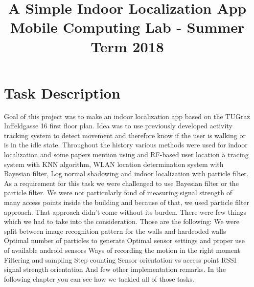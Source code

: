 \documentclass[conference]{IEEEtran}
\begin{document}
\title{A Simple Indoor Localization App\\
{\large Mobile Computing Lab - Summer Term 2018}
}

\author{
\and
{}
}

\maketitle


\section{Task Description}
Goal of this project was to make an indoor localization app based on the TUGraz Inffeldgasse 16 first floor plan. Idea was to use previously developed activity tracking system to detect movement and therefore know if the user is walking or is in the idle state. Throughout the history various methods were used for indoor localization and some papers mention using and RF-based user location a tracing system with KNN algorithm, WLAN location determination system with Bayesian filter, Log normal shadowing and indoor localization with particle filter. As a requirement for this task we were challenged to use Bayesian filter or the particle filter. We were not particularly fond of measuring signal strength of many access points inside the building and because of that, we used particle filter approach. That approach didn’t come without its burden. There were few things which we had to take into the consideration. Those are the following:
We were split between image recognition pattern for the walls and hardcoded walls
Optimal number of particles to generate
Optimal sensor settings and proper use of available android sensors
Ways of recording the motion in the right moment 
Filtering and sampling
Step counting
Sensor orientation vs access point RSSI signal strength orientation
And few other implementation remarks. In the following chapter you can see how we tackled all of those tasks.
\end{document}
